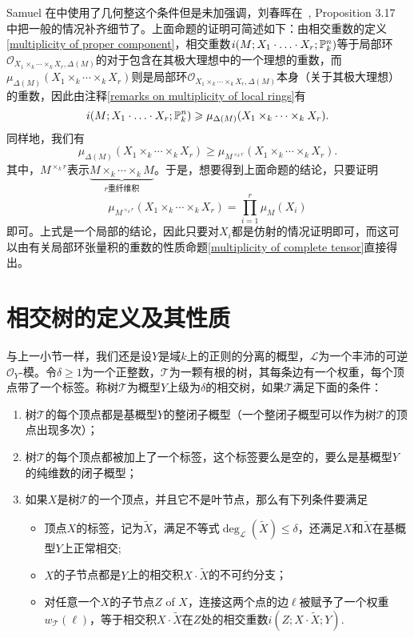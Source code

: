 \begin{remark}
Samuel 在中使用了几何整这个条件但是未加强调，刘春晖在~, Proposition 3.17 中把一般的情况补齐细节了。上面命题的证明可简述如下：由相交重数的定义\ref{multiplicity of proper component}，相交重数$i(M;X_1\cdot\ldots\cdot X_r;\mathbb P^n_k)$等于局部环$\mathcal{O}_{X_1\times_k\cdots\times_k X_r, \Delta(M)}$的对于包含在其极大理想中的一个理想的重数，而$\mu_{\Delta(M)}(X_1\times_k\cdots\times_k X_r)$则是局部环$\mathcal{O}_{X_1\times_k\cdots\times_k X_r, \Delta(M)}$本身（关于其极大理想）的重数，因此由注释\ref{remarks on multiplicity of local rings}有
\begin{equation}
i(M;X_1\cdot\ldots\cdot X_r;\mathbb P^n_k) \geqslant \mu_{\Delta(M)}(X_1\times_k\cdots\times_k X_r).
\end{equation}
同样地，我们有
\begin{equation}
\mu_{\Delta(M)}(X_1\times_k\cdots\times_k X_r) \geqslant \mu_{M^{\times_k r}}(X_1\times_k\cdots\times_k X_r).
\end{equation}
其中，$M^{\times_k r}$表示$\underbrace{M\times_k\cdots\times_k M}_{\text{$r$重纤维积}}$。于是，想要得到上面命题的结论，只要证明
\begin{equation}
\mu_{M^{\times_k r}}(X_1\times_k\cdots\times_k X_r) = \prod\limits_{i=1}^r \mu_M(X_i)
\end{equation}
即可。上式是一个局部的结论，因此只要对$X_i$都是仿射的情况证明即可，而这可以由有关局部环张量积的重数的性质命题\ref{multiplicity of complete tensor}直接得出。
\end{remark}

\section{相交树的定义及其性质}
与上一小节一样，我们还是设$Y$是域$k$上的正则的分离的概型，$\mathscr{L}$为一个丰沛的可逆$\mathcal{O}_Y$-模。令$\delta \geqslant 1$为一个正整数，$\mathscr{T}$为一颗有根的树，其每条边有一个权重，每个顶点带了一个标签。称树$\mathscr{T}$为概型$Y$上级为$\delta$的相交树，如果$\mathscr{T}$满足下面的条件：
\begin{enumerate}
\item 树$\mathscr T$的每个顶点都是基概型$Y$的整闭子概型（一个整闭子概型可以作为树$\mathscr T$的顶点出现多次）；
\item 树$\mathscr T$的每个顶点都被加上了一个标签，这个标签要么是空的，要么是基概型$Y$的纯维数的闭子概型；
\item 如果$X$是树$\mathscr T$的一个顶点，并且它不是叶节点，那么有下列条件要满足
	\begin{itemize}
	\item 顶点$X$的标签，记为$\widetilde{X}$，满足不等式$\deg_{\mathscr{L}}(\widetilde{X})\leqslant \delta$，还满足$X$和$\widetilde{X}$在基概型$Y$上正常相交;
	\item $X$的子节点都是$Y$上的相交积$X\cdot \widetilde{X}$的不可约分支；
	\item 对任意一个$X$的子节点$Z$ of $X$，连接这两个点的边$\ell$被赋予了一个权重$w_{\mathscr{T}}(\ell)$，等于相交积$X\cdot \widetilde{X}$在$Z$处的相交重数$i(Z;X\cdot \widetilde{X}; Y)$.
	\end{itemize}
\end{enumerate}


